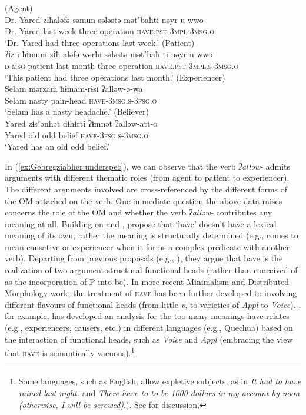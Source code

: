 \documentclass[output=paper]{langscibook}
\begin{document}
\ea\label{ex:Gebregziabher:underspec}
\ea (Agent) \\
\gll Dr. Yared zɨħaləfə-səmun sələstə mətʼbaħti nəyr-u-wwo\\
Dr. Yared last-week three operation {\scshape have.pst-3mpl-3msg.o}\\
\glt `Dr. Yared had three operations last week.'
\ex (Patient) \\
\gll ʔɨz-i-ħɨmum zɨħ aləfə-wərħi sələstə mətʼbaħ ti nəyr-u-wwo\\
{\scshape d-msg-}patient last-month three operation {\scshape have.pst-3mpl.s-3msg.o}\\
\glt `This patient had three operations last month.'
\ex (Experiencer) \\
\gll Selam mərzam ħɨmam-rɨsi ʔalləw-ø-wa  \\
Selam nasty pain-head {\scshape have-3msg.s-3fsg.o}\\
\glt `Selam has a nasty headache.' 
\ex (Believer)  \\
\gll Yared zɨsʼənħət dɨħɨrti ʔɨmnət ʔalləw-att-o \\
Yared old odd belief {\scshape have-3fsg.s-3msg.o} \\
\glt `Yared has an old odd belief.' 
\z
\z

\noindent In (\ref{ex:Gebregziabher:underspec}), we can observe that the verb \textit{ʔalləw-} admits arguments with different thematic roles (from agent to patient to experiencer). The different arguments involved are cross-referenced by the different forms of the OM attached on the verb. One immediate question the above data raises concerns the role of the OM and whether the verb \textit{ʔalləw-} contributes any meaning at all. Building on \citealt{ritterandrosen1993} and \citealt{cowper89}, \citet{ritterandrosen1997} propose that `have' doesn't have a lexical meaning of its own, rather the meaning is structurally determined (e.g., comes to mean causative or experiencer when it forms a complex predicate with another verb). Departing from previous proposals (e.g., \citealt{freeze92}), they argue that {\sc have} is the realization of two argument-structural functional heads (rather than conceived of as the incorporation of P into {\sc be}). In more recent Minimalism and Distributed Morphology work, the treatment of {\scshape have} has been further developed to involving different flavours of functional heads (from little \textit{v}, to varieties of \textit{Appl} to \textit{Voice}). \citet{myler16}, for example, has developed an analysis for the too-many meanings {\sc have} relates (e.g., experiencers, causers, etc.) in different languages (e.g., Quechua) based on the interaction of functional heads, such as \textit{Voice} and \textit{Appl} (embracing the view that {\scshape have} is semantically vacuous).\footnote{Some languages, such as English, allow expletive subjects, as in \emph{It had to have rained last night.} and \emph{There have to to be 1000 dollars in my account by noon (otherwise, I will be screwed)}.). See  for discussion.} 
\end{document}
